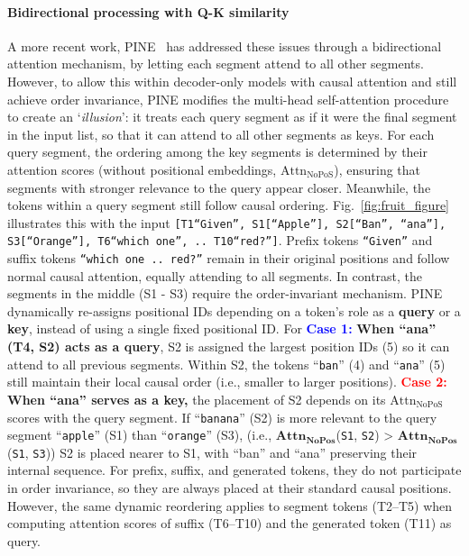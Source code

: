 \paragraph{Bidirectional processing with Q-K similarity}
A more recent work, PINE~\citep{pine} has addressed these issues through a bidirectional attention mechanism, by letting each segment attend to all other segments. However, to allow this within decoder-only models with causal attention and still achieve order invariance, PINE modifies the multi-head self-attention procedure
to create an `\textit{illusion}': it treats each query segment as if it were the final segment in the input list, so that it can attend to all other segments as keys.
For each query segment, the ordering among the key segments is determined by their attention scores (without positional embeddings, $\mathrm{Attn}_{\mathrm{NoPoS}}$), ensuring that segments with stronger relevance to the query appear closer. Meanwhile, the tokens within a query segment still follow causal ordering. Fig.~\ref{fig:fruit_figure} illustrates this with the input \texttt{[T1``Given'', S1[``Apple''], S2[``Ban'', ``ana''], S3[``Orange''], T6``which one'', .. T10``red?'']}. Prefix tokens \texttt{``Given''} and suffix tokens \texttt{``which one .. red?''} remain in their original positions and follow normal causal attention, equally attending to all segments. In contrast, the segments in the middle (S1 - S3) require the order-invariant mechanism. PINE dynamically re-assigns positional IDs depending on a token's role as a \textbf{query} or a \textbf{key}, instead of using a single fixed positional ID. For \textcolor{blue}{\textbf{Case 1:}} \textbf{When ``ana'' (T4, S2) acts as a query}, S2 is assigned the largest position IDs (5) so it can attend to all previous segments. Within S2, the tokens ``\texttt{ban}'' (4) and ``\texttt{ana}'' (5) still maintain their local causal order (i.e., smaller to larger positions). \textcolor{red}{\textbf{Case 2:}} \textbf{When “ana” serves as a key,} the placement of S2 depends on its $\mathrm{Attn}_{\mathrm{NoPoS}}$ scores with the query segment. If ``\texttt{banana}'' (S2) is more relevant to the query segment ``\texttt{apple}'' (S1) than ``\texttt{orange}'' (S3), (i.e., $\mathbf{Attn_{NoPos}}$(\texttt{S1}, \texttt{S2}) > $\mathbf{Attn_{NoPos}}$ (\texttt{S1}, \texttt{S3})) S2 is placed nearer to S1, with “ban” and “ana” preserving their internal sequence. For prefix, suffix, and generated tokens, they do not participate in order invariance, so they are always placed at their standard causal positions. However, the same dynamic reordering applies to segment tokens (T2--T5) when computing attention scores of suffix (T6--T10) and the generated token (T11) as query.


